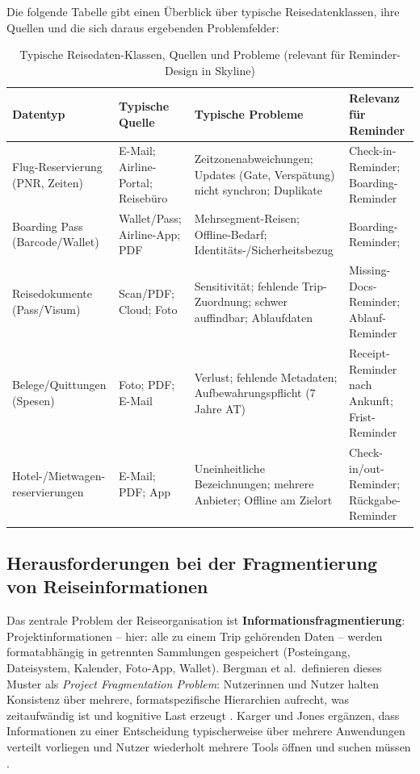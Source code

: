 Die folgende Tabelle gibt einen Überblick über typische Reisedatenklassen,
ihre Quellen und die sich daraus ergebenden Problemfelder:

\begin{table}[H]
\centering
\caption{Typische Reisedaten-Klassen, Quellen und Probleme (relevant für Reminder-Design in Skyline)}
\label{tab:travel_data_classes}
\renewcommand{\arraystretch}{1.2}
\begin{tabularx}{\textwidth}{p{2.8cm} p{3.0cm} X p{2.9cm}}
\toprule
\textbf{Datentyp} & \textbf{Typische Quelle} & \textbf{Typische Probleme} & \textbf{Relevanz für Reminder} \\
\midrule
Flug-Reservierung (PNR, Zeiten) &
E-Mail; Airline-Portal; Reisebüro &
Zeitzonenabweichungen; Updates (Gate, Verspätung) nicht synchron; Duplikate &
Check-in-Reminder; Boarding-Reminder \\
\midrule
Boarding Pass (Barcode/Wallet) &
Wallet/Pass; Airline-App; PDF &
Mehrsegment-Reisen; Offline-Bedarf; Identitäts-/Sicherheitsbezug &
Boarding-Reminder; \\
\midrule
Reisedokumente (Pass/Visum) &
Scan/PDF; Cloud; Foto &
Sensitivität; fehlende Trip-Zuordnung; schwer auffindbar; Ablaufdaten &
Missing-Docs-Reminder; Ablauf-Reminder \\
\midrule
Belege/Quittungen (Spesen) &
Foto; PDF; E-Mail &
Verlust; fehlende Metadaten; Aufbewahrungspflicht (7 Jahre AT) &
Receipt-Reminder nach Ankunft; Frist-Reminder \\
\midrule
Hotel-/Mietwagen- reservierungen &
E-Mail; PDF; App &
Uneinheitliche Bezeichnungen; mehrere Anbieter; Offline am Zielort &
Check-in/out-Reminder; Rückgabe-Reminder \\
\bottomrule
\end{tabularx}
\end{table}

\subsection{Herausforderungen bei der Fragmentierung von Reiseinformationen}

Das zentrale Problem der Reiseorganisation ist \textbf{Informationsfragmentierung}:
Projektinformationen -- hier: alle zu einem Trip gehörenden Daten -- werden
formatabhängig in getrennten Sammlungen gespeichert (Posteingang, Dateisystem,
Kalender, Foto-App, Wallet). Bergman et al.\ definieren dieses Muster als
\textit{Project Fragmentation Problem}: Nutzerinnen und Nutzer halten
Konsistenz über mehrere, formatspezifische Hierarchien aufrecht, was
zeitaufwändig ist und kognitive Last erzeugt
\cite{bergman2006_project_fragmentation}. Karger und Jones ergänzen, dass
Informationen zu einer Entscheidung typischerweise über mehrere Anwendungen
verteilt vorliegen und Nutzer wiederholt mehrere Tools öffnen und suchen müssen
\cite{karger_jones2006_dataunification}.

